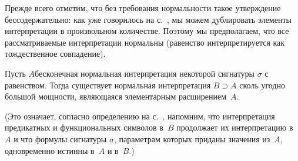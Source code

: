 Прежде всего отметим, что без требования нормальности такое
утверждение бессодержательно: как уже говорилось на
с.~\pageref{clones}, мы можем дублировать элементы интерпретации в
произвольном количестве. Поэтому мы предполагаем, что все
рассматриваемые интерпретации нормальны (равенство
интерпретируется как тождественное совпадение).

\begin{theorem}
%
        \label{lowenheim-skolem-theorem-2}%
Пусть $A$\т бесконечная нормальная интерпретация некоторой
сигнатуры $\sigma$ с равенством. Тогда существует нормальная
интерпретация $B\supset A$ сколь угодно большой мощности,
являющаяся элементарным расширением~$A$.
\end{theorem}

(Это означает, согласно определению на
с.~\pageref{elementary-extension}, напомним, что интерпретация
предикатных и функциональных символов в~$B$ продолжает их
интерпретацию в~$A$ и что формулы сигнатуры $\sigma$, параметрам
которых приданы значения из~$A$, одновременно истинны в~$A$ и
в~$B$.)

